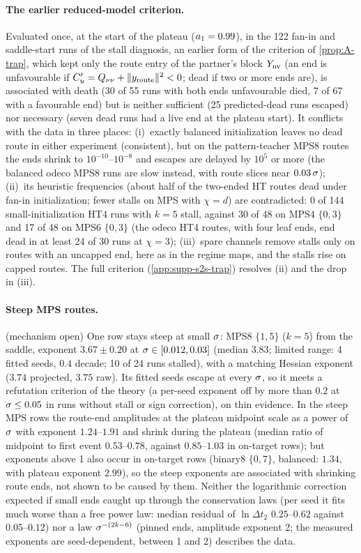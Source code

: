 \paragraph{The earlier reduced-model criterion.}
\empirical{} Evaluated once, at the start of the plateau ($a_{1}=0.99$), in the 122 fan-in and saddle-start runs of the
stall diagnosis, an earlier form of the criterion of \cref{prop:A-trap}, which kept only the route entry of the
partner's block $Y_{\rm nv}$ (an end is unfavourable if $C'_u=Q_{\nu\nu}+\lVert y_{\rm route}\rVert^2<0$; dead if two or more ends
are), is associated with death (30 of 55 runs with both
ends unfavourable died, 7 of 67 with a favourable end) but is neither sufficient (25 predicted-dead runs escaped) nor
necessary (seven dead runs had a live end at the plateau start). It conflicts with the data in three places:
(i)~exactly balanced initialization leaves no dead route in either experiment (consistent), but on the pattern-teacher
MPS8 routes the ends shrink to $10^{-10}$--$10^{-8}$ and escapes are delayed by $10^5$ or more (the balanced odeco MPS8
runs are slow instead, with route slices near $0.03\,\sigma$); (ii)~its heuristic frequencies (about half of the
two-ended HT routes dead under fan-in initialization; fewer stalls on MPS with $\chi=d$) are contradicted: 0 of 144
small-initialization HT4 runs with $k=5$ stall, against 30 of 48 on MPS4 $\{0,3\}$ and 17 of 48 on MPS6 $\{0,3\}$ (the
odeco HT4 routes, with four leaf ends, end dead in at least 24 of 30 runs at $\chi=3$); (iii)~spare channels remove
stalls only on routes with an uncapped end, here as in the regime maps, and the stalls rise on capped routes. The
full criterion (\cref{app:supp-s2s-trap}) resolves (ii) and the drop in (iii).

\paragraph{Steep MPS routes.}
\empirical{} (mechanism open) One row stays steep at small $\sigma$: MPS8 $\{1,5\}$ ($k=5$) from the saddle,
exponent $3.67\pm0.20$ at $\sigma\in[0.012,0.03]$ (median $3.83$; limited range: 4 fitted seeds, $0.4$ decade; 10 of 24 runs
stalled), with a matching Hessian exponent ($3.74$ projected, $3.75$ raw). Its fitted seeds escape at every $\sigma$, so
it meets a refutation criterion of the theory (a per-seed exponent off by more than $0.2$ at $\sigma\le0.05$ in runs
without stall or sign correction), on thin evidence. In the steep MPS rows the route-end amplitudes at the plateau
midpoint scale as a power of $\sigma$ with exponent $1.24$--$1.91$ and shrink during the plateau (median ratio of midpoint to first
event $0.53$--$0.78$, against $0.85$--$1.03$ in on-target rows); but exponents above 1 also occur in on-target rows
(binary8 $\{0,7\}$, balanced: $1.34$, with plateau exponent $2.99$), so the steep exponents are associated with shrinking route ends, not shown
to be caused by them. Neither the logarithmic correction expected if small ends caught up through the conservation
laws (per seed it fits much worse than a free power law: median residual of $\ln\Delta t_2$ $0.25$--$0.62$ against
$0.05$--$0.12$) nor a law $\sigma^{-(2k-6)}$ (pinned ends, amplitude exponent 2; the measured exponents are seed-dependent, between 1
and 2)
describes the data.

